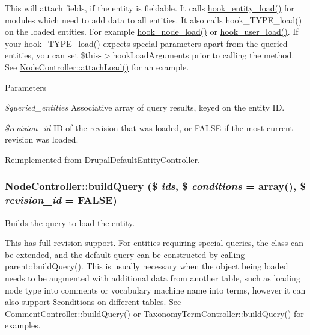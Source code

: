 This will attach fields, if the entity is fieldable. It calls \hyperlink{group__hooks_ga1f594647c8cbb27f75b77cc4118da8d6}{hook\_\-entity\_\-load()} for modules which need to add data to all entities. It also calls hook\_\-TYPE\_\-load() on the loaded entities. For example \hyperlink{group__node__api__hooks_gad48bb14b68ed38526029d1f7ac2d2de4}{hook\_\-node\_\-load()} or \hyperlink{group__hooks_ga81027843e38de3a899fa6e72f876d6b6}{hook\_\-user\_\-load()}. If your hook\_\-TYPE\_\-load() expects special parameters apart from the queried entities, you can set \$this-\/$>$hookLoadArguments prior to calling the method. See \hyperlink{classNodeController_abdc7525854d61d63fa6ee79bb2409359}{NodeController::attachLoad()} for an example.


\begin{DoxyParams}{Parameters}
\item[{\em \$queried\_\-entities}]Associative array of query results, keyed on the entity ID. \item[{\em \$revision\_\-id}]ID of the revision that was loaded, or FALSE if the most current revision was loaded. \end{DoxyParams}


Reimplemented from \hyperlink{classDrupalDefaultEntityController_a68735c41d2ba655a073c64983754edf7}{DrupalDefaultEntityController}.\hypertarget{classNodeController_a0326b94bee0719269dfd9f8ef93fbeb1}{
\subsubsection[{buildQuery}]{\setlength{\rightskip}{0pt plus 5cm}NodeController::buildQuery (\$ {\em ids}, \/  \$ {\em conditions} = {\ttfamily array()}, \/  \$ {\em revision\_\-id} = {\ttfamily FALSE})}}
\label{classNodeController_a0326b94bee0719269dfd9f8ef93fbeb1}
Builds the query to load the entity.

This has full revision support. For entities requiring special queries, the class can be extended, and the default query can be constructed by calling parent::buildQuery(). This is usually necessary when the object being loaded needs to be augmented with additional data from another table, such as loading node type into comments or vocabulary machine name into terms, however it can also support \$conditions on different tables. See \hyperlink{classCommentController_a0feb93a67f87f04b06eb64eb0d359ca7}{CommentController::buildQuery()} or \hyperlink{classTaxonomyTermController_a38102da86b43fb5b2c3c3412cb2ba3d2}{TaxonomyTermController::buildQuery()} for examples.


